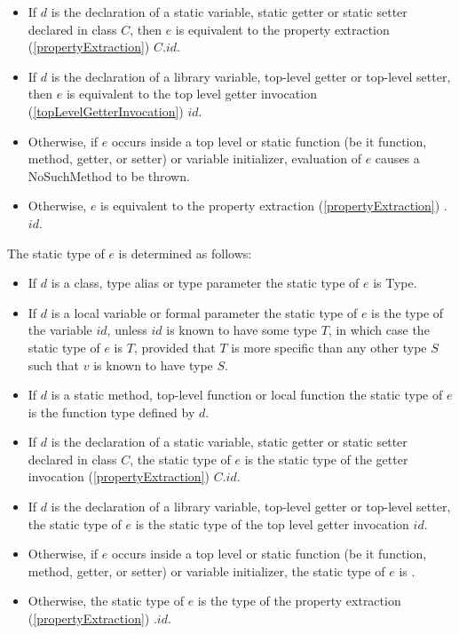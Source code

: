 \documentclass{article}
\newcommand{\code}[1]{{\sf #1}}
\begin{document}
\begin{itemize}
\item If $d$ is the declaration of a static variable, static getter or static setter declared in class $C$, then $e$ is equivalent to the property extraction (\ref{propertyExtraction}) $C.id$.
\item If $d$ is the declaration of a library variable, top-level getter or top-level setter, then $e$ is equivalent to the top level getter invocation (\ref{topLevelGetterInvocation}) $id$.
\item Otherwise, if $e$ occurs inside a top level or static function (be it function, method, getter,  or setter) or variable initializer, evaluation of $e$ causes a \code{NoSuchMethod} to be thrown.
\item Otherwise, $e$ is equivalent to the property extraction (\ref{propertyExtraction}) \THIS{}.$id$.
\end{itemize}

\LMHash{}
The static type of $e$ is determined as follows:

\begin{itemize}
\item If $d$ is a class, type alias or type parameter the static type of $e$ is \code{Type}.
\item If $d$ is a local variable or formal parameter the static type of $e$ is the type of the variable $id$, unless $id$ is known to have some type $T$, in which case the static type of $e$ is $T$, provided that $T$ is more specific than any other type $S$ such that $v$ is known to have type $S$.
\item If $d$ is a static method, top-level function or local function the static type of $e$ is the function type defined by $d$.
\item If $d$ is the declaration of a static variable, static getter or static setter declared in class $C$, the static type of $e$ is the static type of the getter invocation (\ref{propertyExtraction}) $C.id$.
\item If $d$ is the declaration of a library variable, top-level getter or top-level setter, the static type of $e$  is the static type of the top level getter invocation $id$.
\item Otherwise, if $e$ occurs inside a top level or static function (be it function, method, getter,  or setter) or variable initializer, the static type of $e$ is \DYNAMIC{}.
\item Otherwise, the static type of $e$ is the type of the property extraction (\ref{propertyExtraction}) \THIS{}.$id$.
\end{itemize}
\end{document}
